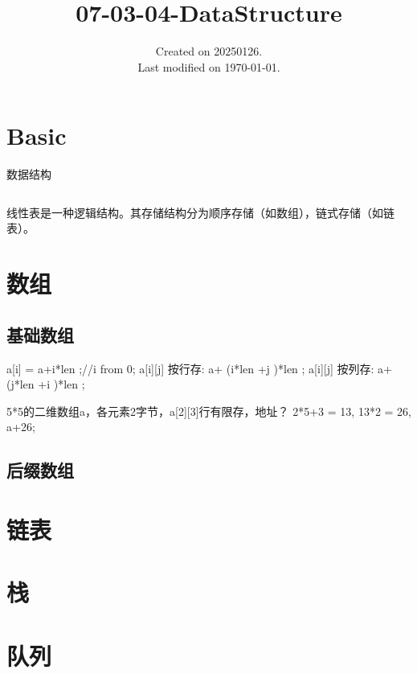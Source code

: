 \documentclass[UTF8]{../../computerUniverse}
\begin{document}
\title{07-03-04-DataStructure}
\date{Created on 20250126.\\   Last modified on \today.}
\maketitle
\tableofcontents



\chapter{Basic}

数据结构

\begin{lstlisting}

\end{lstlisting}

线性表是一种逻辑结构。其存储结构分为顺序存储（如数组），链式存储（如链表）。




\chapter{数组}

\section{基础数组}


a[i] = a+i*len ;//i from 0;
a[i][j]  按行存: a+ (i*len +j )*len ;
a[i][j]  按列存: a+ (j*len +i )*len ;

5*5的二维数组a，各元素2字节，a[2][3]行有限存，地址？
2*5+3 = 13, 13*2 = 26, a+26;


\section{后缀数组}



 
\chapter{链表}
 


\chapter{栈}


\chapter{队列}
\end{document}
